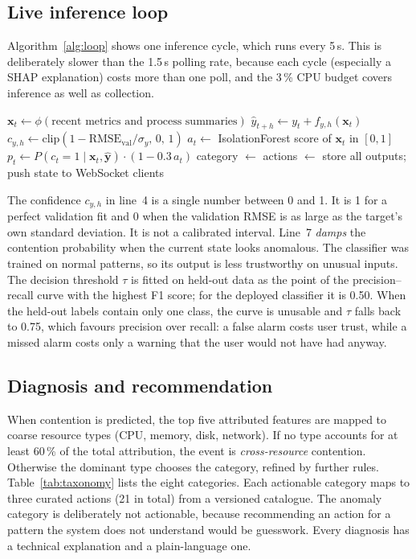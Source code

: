 \documentclass[conference]{IEEEtran}
\begin{document}
\subsection{Live inference loop}
Algorithm~\ref{alg:loop} shows one inference cycle, which runs every 5\,s.
This is deliberately slower than the 1.5\,s polling rate, because each cycle
(especially a SHAP explanation) costs more than one poll, and the 3\,\% CPU
budget covers inference as well as collection.

\begin{algorithm}[t]
\caption{One live-inference cycle (every 5\,s)}
\label{alg:loop}
\begin{algorithmic}[1]
\State $\mathbf{x}_t \gets \phi(\text{recent metrics and process summaries})$
  \State $\hat y_{t+h} \gets y_t + f_{y,h}(\mathbf{x}_t)$ 
  \State $c_{y,h} \gets \mathrm{clip}(1-\mathrm{RMSE}_{\text{val}}/\sigma_y,\,0,\,1)$
\EndFor
\State $a_t \gets$ IsolationForest score of $\mathbf{x}_t$ in $[0,1]$
\State $p_t \gets P(c_t{=}1\mid\mathbf{x}_t,\hat{\mathbf{y}})\cdot(1-0.3\,a_t)$
  \State category $\gets$ 
  \State actions $\gets$ 
\EndIf
\State store all outputs; push state to WebSocket clients
\end{algorithmic}
\end{algorithm}

The confidence $c_{y,h}$ in line~4 is a single number between 0 and 1. It
is 1 for a perfect validation fit and 0 when the validation RMSE is as large as
the target's own standard deviation. It is not a calibrated interval. Line~7
\emph{damps} the contention probability when the current state looks
anomalous. The classifier was trained on normal patterns, so its output is
less trustworthy on unusual inputs. The decision threshold $\tau$ is fitted
on held-out data as the point of the precision--recall curve with the highest
F1 score; for the deployed classifier it is 0.50. When the held-out labels
contain only one class, the curve is unusable and $\tau$ falls back to 0.75,
which favours precision over recall: a false alarm costs user trust, while a
missed alarm costs only a warning that the user would not have had anyway.

\subsection{Diagnosis and recommendation}
When contention is predicted, the top five attributed features are mapped to
coarse resource types (CPU, memory, disk, network). If no type accounts for at
least 60\,\% of the total attribution, the event is \emph{cross-resource}
contention. Otherwise the dominant type chooses the category, refined by
further rules. Table~\ref{tab:taxonomy} lists the eight categories. Each
actionable category maps to three curated actions (21 in total) from a
versioned catalogue. The anomaly category is deliberately not actionable,
because recommending an action for a pattern the system does not understand
would be guesswork. Every diagnosis has a technical explanation and a
plain-language one.
\end{document}
